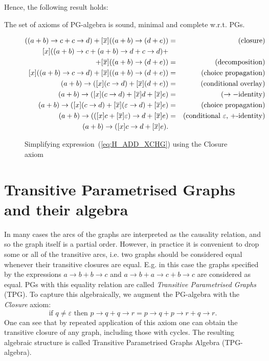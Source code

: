Hence, the following result holds:
\begin{thm}
 The set of axioms of PG-algebra
is sound, minimal and complete w.r.t. PGs.
\end{thm}
\begin{figure}

\begin{eqnarray*}
[x]((a+b)\rightarrow c+c\rightarrow d)+[\overline{x}]((a+b)\rightarrow(d+e)) & = & (\textrm{closure)}\\
{}[x]((a+b)\rightarrow c+(a+b)\rightarrow d+c\rightarrow d)+\\+[\overline{x}]((a+b)\rightarrow(d+e)) & = & (\textrm{decomposition)}\\
{}[x]((a+b)\rightarrow c\rightarrow d)+[\overline{x}]((a+b)\rightarrow(d+e)) & = & (\textrm{choice propagation)}\\
(a+b)\rightarrow([x](c\rightarrow d)+[\overline{x}](d+e)) & = & (\textrm{conditional overlay)}\\
(a+b)\rightarrow([x](c\rightarrow d)+[\overline{x}]d+[\overline{x}]e) & = & (\rightarrow-\textrm{identity)}\\
(a+b)\rightarrow([x](c\rightarrow d)+[\overline{x}](\varepsilon\rightarrow d)+[\overline{x}]e) & = & (\textrm{choice propagation)}\\
(a+b)\rightarrow(([x]c+[\overline{x}]\varepsilon)\rightarrow d+[\overline{x}]e) & = & (\textrm{conditional \ensuremath{\varepsilon}, +-\textrm{identity)}}\\
(a+b)\rightarrow([x]c\rightarrow d+[\overline{x}]e).
\end{eqnarray*}


\caption{Simplifying expression~(\ref{eq:H_ADD_XCHG}) using the Closure axiom\label{fig:Simplifying-TPG-expressions}}
\end{figure}

\section{Transitive Parametrised Graphs and their algebra}

In many cases the arcs of the graphs are interpreted as the causality
relation, and so the graph itself is a partial order. However, in
practice it is convenient to drop some or all of the transitive arcs,
i.e. two graphs should be considered equal whenever their transitive
closures are equal. E.g. in this case the graphs specified by the
expressions $a\rightarrow b+b\rightarrow c$ and $a\rightarrow b+a\rightarrow c+b\rightarrow c$
are considered as equal. PGs with this equality relation are called
\emph{Transitive Parametrised Graphs} (TPG). To capture this algebraically,
we augment the PG-algebra with the \emph{Closure} axiom:
\[
\mbox{{if\ }}q\neq\varepsilon\mbox{{\ then\ }}p\!\rightarrow\! q+q\!\rightarrow\! r=p\!\rightarrow\! q+p\!\rightarrow\! r+q\!\rightarrow\! r.
\]
One can see that by repeated application of this axiom one can obtain
the transitive closure of any graph, including those with cycles.
The resulting algebraic structure is called Transitive Parametrised Graphs Algebra
(TPG-algebra).

